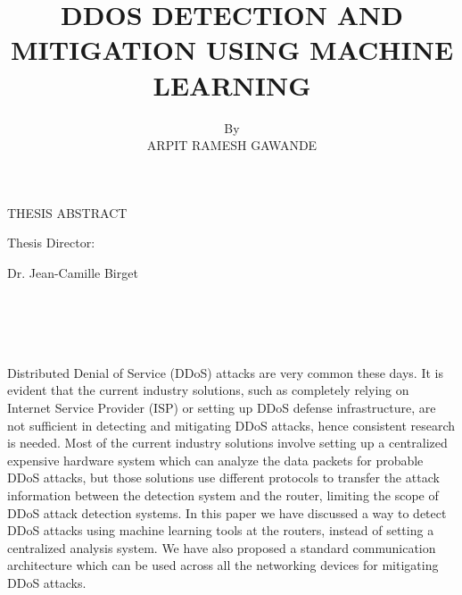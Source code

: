 \documentclass[12pt,oneside,a4paper]{article}
\title{DDOS DETECTION AND MITIGATION USING MACHINE LEARNING}
\author{By \\ ARPIT RAMESH GAWANDE}
\date{}
\begin{document}
\renewcommand{\thepage}{\roman{page}}%
\setcounter{page}{2}%
\makeatletter
{\centering THESIS ABSTRACT \par
\vspace{3mm}
\large\@title \par
\vspace{3mm}
\@author \par
\vspace{3mm}
Thesis Director: \par
Dr. Jean-Camille Birget \par}
\\~\\~\\~\\ %
Distributed Denial of Service (DDoS) attacks are very common these days. It is evident that the current industry solutions, such as completely relying on Internet Service Provider (ISP) or setting up DDoS defense infrastructure, are not sufficient in detecting and mitigating DDoS attacks, hence consistent research is needed. Most of the current industry solutions involve setting up a centralized expensive hardware system which can analyze the data packets for probable DDoS attacks, but those solutions use different protocols to transfer the attack information between the detection system and the router, limiting the scope of DDoS attack detection systems. In this paper we have discussed a way to detect DDoS attacks using machine learning tools at the routers, instead of setting a centralized analysis system. We have also proposed a standard communication architecture which can be used across all the networking devices for mitigating DDoS attacks.
\end{document}
